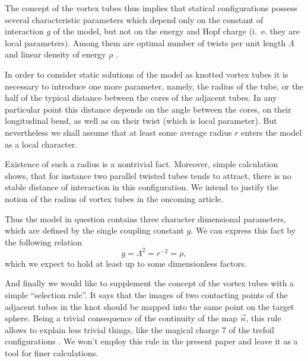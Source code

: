 \documentclass[a4paper,12pt]{article}
\begin{document}
        The concept of the vortex tubes thus implies that statical 
        configurations  possess several characteristic parameters
        which depend only on the constant of interaction 
    $ g $
        of the model, but not on the energy and Hopf charge (i.~e. they
        are local parameters). Among them are optimal number of twists
        per unit length 
    $ \Lambda $
        and linear density of energy 
    $ \rho $
\cite{NS}.

        In order to consider static solutions of the model as knotted
        vortex tubes it is necessary to introduce one more parameter,
        namely, the radius of the tube, or the half of the typical 
        distance between the cores of the adjacent tubes.
        In any particular point this distance depends on the angle
        between the cores, on their longitudinal bend, as well as on
        their twist (which is local parameter). But nevertheless we 
	shall assume that at least some average radius
    $ r $
        enters the model as a local character.

        Existence of such a radius is a nontrivial fact.
        Moreover, simple calculation shows, that for instance two parallel
        twisted tubes tends to attract, there is no stable distance of
        interaction in this configuration.
        We intend to justify the notion of the radius of vortex tubes
        in the oncoming article.

        Thus the model in question contains three character
        dimensional parameters, which are defined by the single coupling
        constant 
    $ g $.
        We can express this fact by the following relation
\begin{equation}
    g = \Lambda^{2} = r^{-2} = \rho ,
\end{equation}
        which we expect to hold at least up to some dimensionless factors.

        And finally we would like to supplement the concept of the vortex
        tubes with a simple ``selection rule''. It says that the images of
        two contacting points of the adjacent tubes in the knot should be
        mapped into the same point on the target sphere.
        Being a trivial consequence of the continuity of the map 
    $ \vec{n} $,
        this rule allows to explain less trivial things, like the magical
        charge 7 of the trefoil configurations
\cite{}.
	We won't employ this rule in the present paper and leave it as a tool
	for finer calculations.
\end{document}
